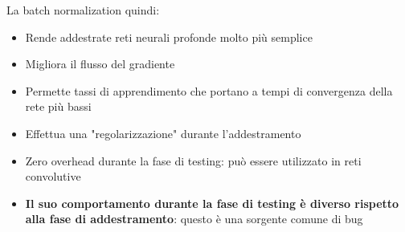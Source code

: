 \documentclass[12pt]{article}
\begin{document}
La batch normalization quindi:
\begin{itemize}
    \item Rende addestrate reti neurali profonde molto più semplice
    \item Migliora il flusso del gradiente
    \item Permette tassi di apprendimento che portano a tempi di convergenza della rete più bassi
    \item Effettua una "regolarizzazione" durante l'addestramento
    \item Zero overhead durante la fase di testing: può essere utilizzato in reti convolutive
    \item \textbf{Il suo comportamento durante la fase di testing è diverso rispetto alla fase di addestramento}: questo è una sorgente comune di bug
\end{itemize}
\end{document}
